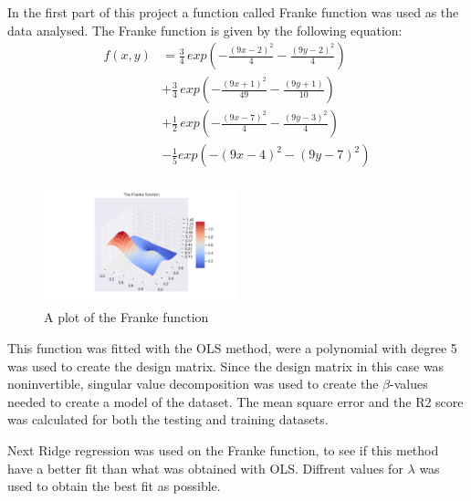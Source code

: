 \thispagestyle{plain}

\noindent In the first part of this project a function called Franke function was used as the data analysed. The Franke function is given by the following equation:
\begin{align*}
    f(x,y) &= \frac{3}{4} \, exp\left(- \frac{(9x-2)^2}{4} - \frac{(9y-2)^2}{4}\right) \\
    &+ \frac{3}{4}\, exp\left( - \frac{(9x +1)^2}{49} - \frac{(9y+1)}{10}\right) \\
    &+ \frac{1}{2}\, exp\left( -\frac{(9x-7)^2}{4} - \frac{(9y-3)^2}{4}\right) \\
    &- \frac{1}{5} exp \left( - (9x -4)^2 - (9y-7)^2\right)
\end{align*}
\begin{figure}[H]
	\centering
	\includegraphics[width=0.5\textwidth]{Figure_1.png}
	\caption{\centering A plot of the Franke function }
	\label{Franke function}
\end{figure}
\noindent This function was fitted with the OLS method, were a polynomial with degree 5 was used to create the design matrix. Since the design matrix in this case was noninvertible, singular value decomposition was used to create the $\beta$-values needed to create a model of the dataset. The mean square error and the R2 score was calculated for both the testing and training datasets. \newline \newline

\noindent Next Ridge regression was used on the Franke function, to see if this method have a better fit than what was obtained with OLS. Diffrent values for $\lambda$ was used to obtain the best fit as possible.
